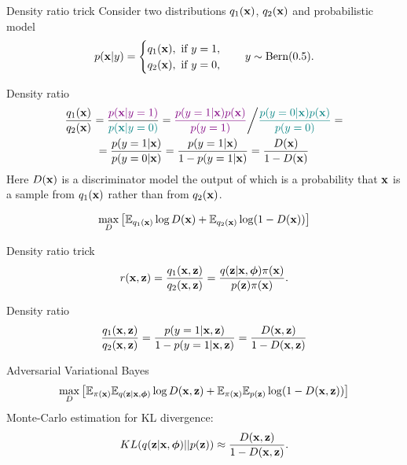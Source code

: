 \begin{frame}{Density ratio trick}
	Consider two distributions $q_1(\mathbf{x})$, $q_2(\mathbf{x})$ and probabilistic model
	\[
		p(\mathbf{x} | y) = \begin{cases}
			q_1(\mathbf{x}), \text{ if } y = 1, \\
			q_2(\mathbf{x}), \text{ if } y = 0,
		\end{cases}
		\quad 
		y \sim \text{Bern}(0.5).
	\]
	\vspace{-0.3cm}
	\begin{block}{Density ratio}
		\vspace{-0.7cm}
		{\small
		\begin{multline*}
			\frac{q_1(\mathbf{x})}{q_2(\mathbf{x})} = \frac{{\color{violet}p(\mathbf{x} | y = 1)}}{{\color{teal}p(\mathbf{x} | y = 0)}} = {\color{violet}\frac{p(y = 1 | \mathbf{x}) p(\mathbf{x})}{p(y=1)}} \bigg/ {\color{teal}\frac{p(y = 0 | \mathbf{x}) p(\mathbf{x})}{p(y=0)}} = \\
			= \frac{p(y = 1 | \mathbf{x})}{p(y = 0 | \mathbf{x})} = \frac{p(y = 1 | \mathbf{x})}{1 - p(y = 1 | \mathbf{x})} = \frac{D(\mathbf{x})}{1 - D(\mathbf{x})}
		\end{multline*}
		}
	Here $D(\mathbf{x})$ is a discriminator model the output of which is a probability that $\mathbf{x}$ is a sample from $q_1(\mathbf{x})$ rather than from $q_2(\mathbf{x})$.
	\end{block}
		\vspace{-0.3cm}
		\[
			\max_D \left[ \mathbb{E}_{q_1(\mathbf{x})} \log D(\mathbf{x}) + \mathbb{E}_{q_2(\mathbf{x})} \log (1 - D(\mathbf{x})) \right]
		\]
\end{frame}
\begin{frame}{Density ratio trick}
	\[
		r(\mathbf{x}, \mathbf{z}) = \frac{q_1(\mathbf{x}, \mathbf{z})}{q_2(\mathbf{x}, \mathbf{z})} = \frac{q(\mathbf{z}| \mathbf{x}, \boldsymbol{\phi}) \pi (\mathbf{x})}{p(\mathbf{z}) \pi(\mathbf{x})}.
	\] 
	\begin{block}{Density ratio}
		\vspace{-0.2cm}
		\[
			\frac{q_1(\mathbf{x}, \mathbf{z})}{q_2(\mathbf{x}, \mathbf{z})} = \frac{p(y = 1 | \mathbf{x}, \mathbf{z})}{1 - p(y = 1 | \mathbf{x}, \mathbf{z})} = \frac{D(\mathbf{x}, \mathbf{z})}{1 - D(\mathbf{x}, \mathbf{z})}
		\]
	\end{block}
	\begin{block}{Adversarial Variational Bayes}
		\vspace{-0.6cm}
		\[
		\max_D \left[ \mathbb{E}_{\pi(\mathbf{x})} \mathbb{E}_{q(\mathbf{z} | \mathbf{x}, \boldsymbol{\phi})} \log D(\mathbf{x}, \mathbf{z}) + \mathbb{E}_{\pi(\mathbf{x})} \mathbb{E}_{p(\mathbf{z})} \log (1 - D(\mathbf{x}, \mathbf{z})) \right]
		\]
		Monte-Carlo estimation for KL divergence:
		\vspace{-0.2cm}
		\[
			KL(q(\mathbf{z}| \mathbf{x}, \boldsymbol{\phi}) || p(\mathbf{z})) \approx \frac{D(\mathbf{x}, \mathbf{z})}{1 - D(\mathbf{x}, \mathbf{z})}.
		\]
	\end{block}
\end{frame}
